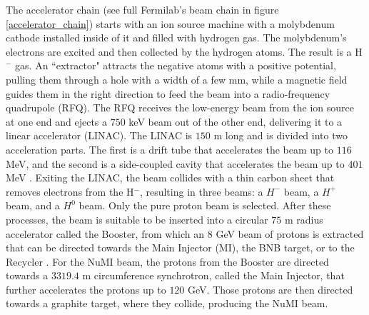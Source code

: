 The accelerator chain (see full Fermilab's beam chain in figure \ref{accelerator_chain}) starts with an ion source machine with a molybdenum cathode installed inside of it and filled with hydrogen gas. The molybdenum's electrons are excited and then collected by the hydrogen atoms. The result is a H$^-$ gas. An ``extractor" attracts the negative atoms with a positive potential, pulling them through a hole with a width of a few mm, while a magnetic field guides them in the right direction to feed the beam into a radio-frequency quadrupole (RFQ). The RFQ receives the low-energy beam from the ion source at one end and ejects a $750$ keV \cite{RFQ_website} beam out of the other end, delivering it to a linear accelerator (LINAC). The LINAC is $150$ m  long and is divided into two acceleration parts. The first is a drift tube that accelerates the beam up to $116$ MeV, and the second is a side-coupled cavity that accelerates the beam up to $401$ MeV \cite{LINAC_website}. Exiting the LINAC, the beam collides with a thin carbon sheet that removes electrons from the H$^-$, resulting in three beams: a $H^-$ beam, a $H^+$ beam, and a $H^0$ beam. Only the pure proton beam is selected. After these processes, the beam is suitable to be inserted into a circular $75$ m radius accelerator called the Booster, from which an $8$ GeV beam of protons is extracted that can be directed towards the Main Injector (MI), the BNB target, or to the Recycler \cite{booster_website}. For the NuMI beam, the protons from the Booster are directed towards a $3319.4$ m circumference synchrotron, called the Main Injector, that further accelerates the protons up to $120$ GeV. Those protons are then directed towards a graphite target, where they collide, producing the NuMI beam.

